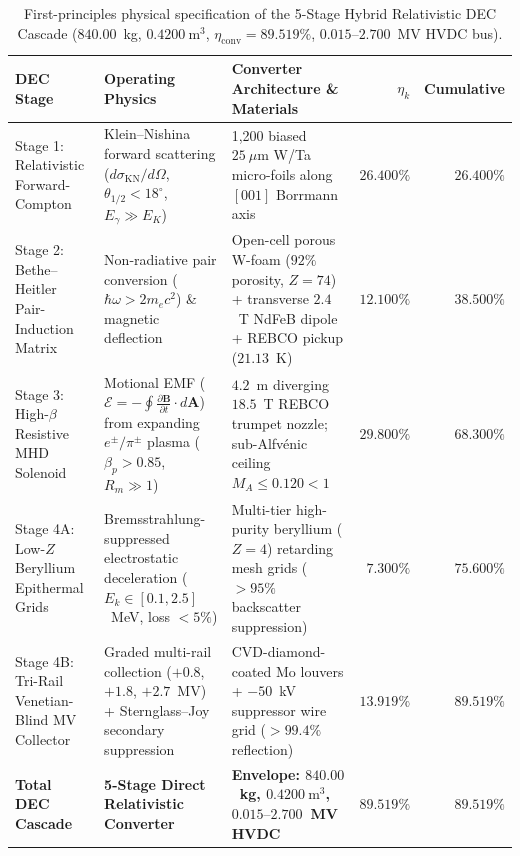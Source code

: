 \documentclass[11pt,onecolumn]{article}
\begin{document}
\begin{table}[!htbp]
\centering\footnotesize
\caption{First-principles physical specification of the 5-Stage Hybrid Relativistic DEC Cascade ($840.00$~kg, $0.4200~\text{m}^3$, $\eta_{\text{conv}} = 89.519\%$, $0.015\text{--}2.700$~MV HVDC bus).}
\label{tab:mar312_dec_cascade}
\begin{tabularx}{\textwidth}{@{}p{2.9cm} p{3.5cm} X r r@{}}
\toprule
DEC Stage & Operating Physics & Converter Architecture \& Materials & $\eta_k$ & Cumulative \\
\midrule
Stage 1: Relativistic Forward-Compton & Klein--Nishina forward scattering ($d\sigma_{\text{KN}}/d\Omega$, $\theta_{1/2} < 18^\circ$, $E_\gamma \gg E_K$) & 1,200 biased $25~\mu\text{m}$ W/Ta micro-foils along $[001]$ Borrmann axis & $26.400\%$ & $26.400\%$ \\
Stage 2: Bethe--Heitler Pair-Induction Matrix & Non-radiative pair conversion ($\hbar\omega > 2m_e c^2$) \& magnetic deflection & Open-cell porous W-foam ($92\%$ porosity, $Z=74$) + transverse $2.4$~T NdFeB dipole + REBCO pickup ($21.13$~K) & $12.100\%$ & $38.500\%$ \\
Stage 3: High-$\beta$ Resistive MHD Solenoid & Motional EMF ($\mathcal{E} = -\oint \frac{\partial \mathbf{B}}{\partial t}\cdot d\mathbf{A}$) from expanding $e^\pm/\pi^\pm$ plasma ($\beta_p > 0.85$, $R_m \gg 1$) & $4.2$~m diverging $18.5$~T REBCO trumpet nozzle; sub-Alfvénic ceiling $M_A \le 0.120 < 1$ & $29.800\%$ & $68.300\%$ \\
Stage 4A: Low-$Z$ Beryllium Epithermal Grids & Bremsstrahlung-suppressed electrostatic deceleration ($E_k \in [0.1, 2.5]$~MeV, loss $<5\%$) & Multi-tier high-purity beryllium ($Z=4$) retarding mesh grids ($>95\%$ backscatter suppression) & $7.300\%$ & $75.600\%$ \\
Stage 4B: Tri-Rail Venetian-Blind MV Collector & Graded multi-rail collection ($+0.8$, $+1.8$, $+2.7$~MV) + Sternglass--Joy secondary suppression & CVD-diamond-coated Mo louvers + $-50$~kV suppressor wire grid ($>99.4\%$ reflection) & $13.919\%$ & $89.519\%$ \\
\midrule
\textbf{Total DEC Cascade} & \textbf{5-Stage Direct Relativistic Converter} & \textbf{Envelope: $840.00$~kg, $0.4200~\text{m}^3$, $0.015\text{--}2.700$~MV HVDC} & $\mathbf{89.519\%}$ & $\mathbf{89.519\%}$ \\
\bottomrule
\end{tabularx}
\end{table}

\FloatBarrier
\end{document}
